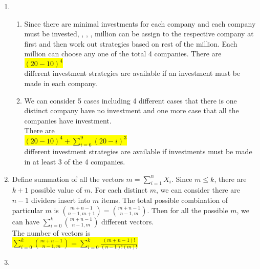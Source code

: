\documentclass{article}
\begin{document}
\begin{enumerate}
\begin{enumerate}
		
	\end{enumerate}
	\item
	\begin{enumerate}
		\item
		\mysolu
		Since there are minimal investments for each company and each company must be invested, , , ,  million can be assign to the respective company at first and then work out strategies based on rest of the  million. Each  million can choose any one of the total 4 companies.
		\myansw
		There are\\
		\colorbox{yellow}{
			${(20-10)^{4}}$
		}\\
		different investment strategies are available if an investment must be made in each company.\\
		
		\item 
		\mysolu
		We can consider 5 cases including 4 different cases that there is one distinct company have no investment and one more case that all the companies have investment.\\
		\myansw
		There are\\
		\colorbox{yellow}{
			${(20-10)^{4}+\sum\limits_{i=6}^9(20-i)^3}$
		}\\
		different investment strategies are available if investments must be made in at least 3 of the 4 companies.\\
		
		
		 
	\end{enumerate}
	\item

		\mysolu
		Define summation of all the vectors ${m=\sum\limits_{i=1}^nX_i}$. Since ${m\leq{k}}$, there are ${k+1}$ possible value of ${m}$. For each distinct ${m}$, we can consider there are ${n-1}$ dividers insert into ${m}$ items. The total possible combination of particular ${m}$ is ${{m+n-1\choose n-1,m+1}={ m+n-1 \choose n-1,m}}$. Then for all the possible ${m}$, we can have ${\sum\limits_{i=0}^k{ m+n-1 \choose n-1,m}}$ different vectors.\\
		\myansw
		The number of vectors is\\
		\colorbox{yellow}{
			${\sum\limits_{i=0}^k{ m+n-1 \choose n-1,m}=\sum\limits_{i=0}^k \frac{(m+n-1)!}{(n-1)!(m)!}}$
		}\\
		

	\item


\end{enumerate}
\end{document}

